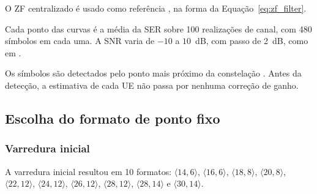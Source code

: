 O ZF centralizado é usado como referência \cite{zhao2025jsac}, na forma da Equação~\eqref{eq:zf_filter}.


Cada ponto das curvas é a média da SER sobre 100 realizações de canal, com 480 símbolos em cada uma. A SNR varia de $-10$ a $10$~dB, com passo de 2~dB, como em .

Os símbolos são detectados pelo ponto mais próximo da constelação \cite{zhao2025jsac}. Antes da detecção, a estimativa de cada UE não passa por nenhuma correção de ganho.

\subsection{Escolha do formato de ponto fixo}

\subsubsection{Varredura inicial}
A varredura inicial resultou em 10 formatos: $\langle 14,6\rangle$, $\langle 16,6\rangle$, $\langle 18,8\rangle$, $\langle 20,8\rangle$, $\langle 22,12\rangle$, $\langle 24,12\rangle$, $\langle 26,12\rangle$, $\langle 28,12\rangle$, $\langle 28,14\rangle$ e $\langle 30,14\rangle$.

